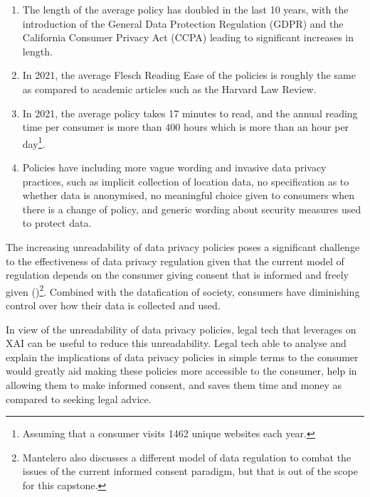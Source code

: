 \begin{enumerate}
  \item The length of the average policy has doubled in the last 10 years, with the introduction of the General Data Protection Regulation (GDPR) and the California Consumer Privacy Act (CCPA) leading to significant increases in length.
  \item In 2021, the average Flesch Reading Ease of the policies is roughly the same as compared to academic articles such as the Harvard Law Review.
  \item In 2021, the average policy takes 17 minutes to read, and the annual reading time per consumer is more than 400 hours which is more than an hour per day\footnote{Assuming that a consumer visits 1462 unique websites each year.}.
  \item Policies have including more vague wording and invasive data privacy practices, such as implicit collection of location data, no specification as to whether data is anonymised, no meaningful choice given to consumers when there is a change of policy, and generic wording about security measures used to protect data.
\end{enumerate}

The increasing unreadability of data privacy policies poses a significant challenge to the effectiveness of data privacy regulation given that the current model of regulation depends on the consumer giving consent that is informed and freely given (\cite{mantelero_2014})\footnote{Mantelero also discusses a different model of data regulation to combat the issues of the current informed consent paradigm, but that is out of the scope for this capstone.}. Combined with the datafication of society, consumers have diminishing control over how their data is collected and used. 

In view of the unreadability of data privacy policies, legal tech that leverages on XAI can be useful to reduce this unreadability. Legal tech able to analyse and explain the implications of data privacy policies in simple terms to the consumer would greatly aid making these policies more accessible to the consumer, help in allowing them to make informed consent, and saves them time and money as compared to seeking legal advice.

